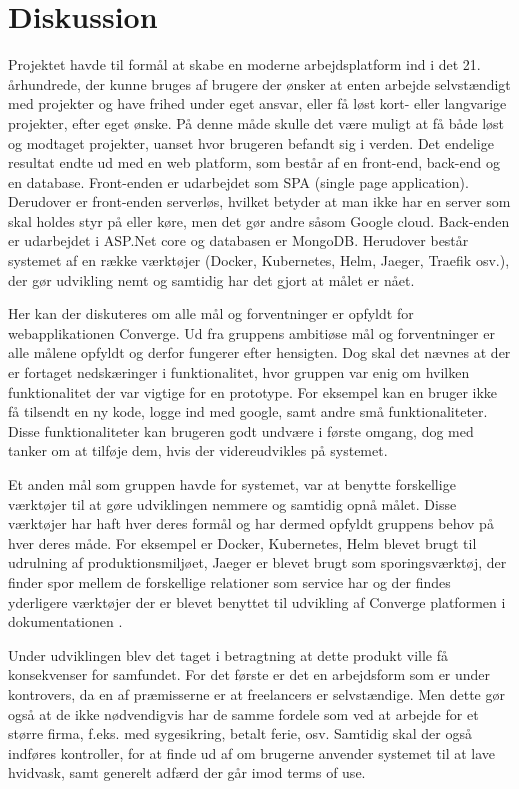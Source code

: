 \chapter{Diskussion}
\label{cha:discussion}

Projektet havde til formål at skabe en moderne arbejdsplatform ind i det 21. århundrede, der kunne bruges af brugere der ønsker at enten arbejde selvstændigt med projekter og have frihed under eget ansvar, eller få løst kort- eller langvarige projekter, efter eget ønske. På denne måde skulle det være muligt at få både løst og modtaget projekter, uanset hvor brugeren befandt sig i verden. Det endelige resultat endte ud med en web platform, som består af en front-end, back-end og en database. Front-enden er udarbejdet som SPA (single page application). Derudover er front-enden serverløs, hvilket betyder at man ikke har en server som skal holdes styr på eller køre, men det gør andre såsom Google cloud. Back-enden er udarbejdet i ASP.Net core og databasen er MongoDB. Herudover består systemet af en række værktøjer (Docker, Kubernetes, Helm, Jaeger, Traefik osv.), der gør udvikling nemt og samtidig har det gjort at målet er nået.

Her kan der diskuteres om alle mål og forventninger er opfyldt for webapplikationen Converge. Ud fra gruppens ambitiøse mål og forventninger er alle målene opfyldt og derfor fungerer efter hensigten. Dog skal det nævnes at der er fortaget nedskæringer i funktionalitet, hvor gruppen var enig om hvilken funktionalitet der var vigtige for en prototype. For eksempel kan en bruger ikke få tilsendt en ny kode, logge ind med google, samt andre små funktionaliteter. Disse funktionaliteter kan brugeren godt undvære i første omgang, dog med tanker om at tilføje dem, hvis der videreudvikles på systemet. 

Et anden mål som gruppen havde for systemet, var at benytte forskellige værktøjer til at gøre udviklingen nemmere og samtidig opnå målet. Disse værktøjer har haft hver deres formål og har dermed opfyldt gruppens behov på hver deres måde. For eksempel er Docker, Kubernetes, Helm blevet brugt til udrulning af produktionsmiljøet, Jaeger er blevet brugt som sporingsværktøj, der finder spor mellem de forskellige relationer som service har og der findes yderligere værktøjer der er blevet benyttet til udvikling af Converge platformen i dokumentationen \cite{Research}.

Under udviklingen blev det taget i betragtning at dette produkt ville få konsekvenser for samfundet. For det første er det en arbejdsform som er under kontrovers, da en af præmisserne er at freelancers er selvstændige. Men dette gør også at de ikke nødvendigvis har de samme fordele som ved at arbejde for et større firma, f.eks. med sygesikring, betalt ferie, osv. Samtidig skal der også indføres kontroller, for at finde ud af om brugerne anvender systemet til at lave hvidvask, samt generelt adfærd der går imod terms of use.

